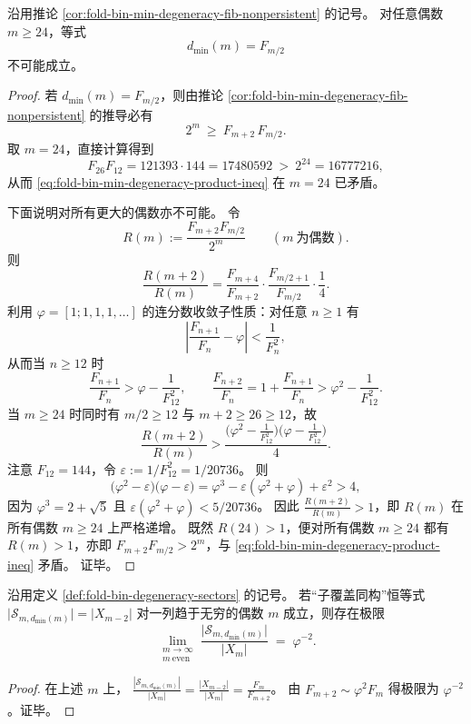 \begin{corollary}\label{cor:fold-bin-min-degeneracy-fib-explicit-cutoff}
沿用推论 \ref{cor:fold-bin-min-degeneracy-fib-nonpersistent} 的记号。
对任意偶数 \(m\ge 24\)，等式
\[
d_{\min}(m)=F_{m/2}
\]
不可能成立。
\end{corollary}
\begin{proof}
若 \(d_{\min}(m)=F_{m/2}\)，则由推论 \ref{cor:fold-bin-min-degeneracy-fib-nonpersistent} 的推导必有
\begin{equation}\label{eq:fold-bin-min-degeneracy-product-ineq}
2^m\ \ge\ F_{m+2}\,F_{m/2}.
\end{equation}
取 \(m=24\)，直接计算得到
\[
F_{26}F_{12}=121393\cdot 144=17480592\ >\ 2^{24}=16777216,
\]
从而 \eqref{eq:fold-bin-min-degeneracy-product-ineq} 在 \(m=24\) 已矛盾。
\par
下面说明对所有更大的偶数亦不可能。
令
\[
R(m):=\frac{F_{m+2}F_{m/2}}{2^m}\qquad(m\ \text{为偶数}).
\]
则
\[
\frac{R(m+2)}{R(m)}
=\frac{F_{m+4}}{F_{m+2}}\cdot \frac{F_{m/2+1}}{F_{m/2}}\cdot \frac{1}{4}.
\]
利用 \(\varphi=[1;1,1,1,\dots]\) 的连分数收敛子性质：对任意 \(n\ge 1\) 有
\[
\left|\frac{F_{n+1}}{F_n}-\varphi\right|<\frac{1}{F_n^2},
\]
从而当 \(n\ge 12\) 时
\[
\frac{F_{n+1}}{F_n}>\varphi-\frac{1}{F_{12}^2},
\qquad
\frac{F_{n+2}}{F_n}=1+\frac{F_{n+1}}{F_n}>\varphi^2-\frac{1}{F_{12}^2}.
\]
当 \(m\ge 24\) 时同时有 \(m/2\ge 12\) 与 \(m+2\ge 26\ge 12\)，故
\[
\frac{R(m+2)}{R(m)}
>\frac{\bigl(\varphi^2-\frac{1}{F_{12}^2}\bigr)\bigl(\varphi-\frac{1}{F_{12}^2}\bigr)}{4}.
\]
注意 \(F_{12}=144\)，令 \(\varepsilon:=1/F_{12}^2=1/20736\)。
则
\[
\bigl(\varphi^2-\varepsilon\bigr)\bigl(\varphi-\varepsilon\bigr)
=\varphi^3-\varepsilon(\varphi^2+\varphi)+\varepsilon^2
>4,
\]
因为 \(\varphi^3=2+\sqrt5\) 且 \(\varepsilon(\varphi^2+\varphi)<5/20736\)。
因此 \(\frac{R(m+2)}{R(m)}>1\)，即 \(R(m)\) 在所有偶数 \(m\ge 24\) 上严格递增。
既然 \(R(24)>1\)，便对所有偶数 \(m\ge 24\) 都有 \(R(m)>1\)，亦即 \(F_{m+2}F_{m/2}>2^m\)，与 \eqref{eq:fold-bin-min-degeneracy-product-ineq} 矛盾。
证毕。
\end{proof}

\begin{corollary}[子覆盖同构外推下的最小扇区密度极限]\label{cor:fold-bin-minsector-density-phi-minus2}
沿用定义 \ref{def:fold-bin-degeneracy-sectors} 的记号。
若“子覆盖同构”恒等式
\(
\bigl|\mathcal{S}_{m,d_{\min}(m)}\bigr|=|X_{m-2}|
\)
对一列趋于无穷的偶数 \(m\) 成立，则存在极限
\[
\lim_{\substack{m\to\infty\\ m\ \mathrm{even}}}
\frac{\bigl|\mathcal{S}_{m,d_{\min}(m)}\bigr|}{|X_m|}
\;=\;
\varphi^{-2}.
\]
\end{corollary}
\begin{proof}
在上述 \(m\) 上，
\(
\frac{|\mathcal{S}_{m,d_{\min}(m)}|}{|X_m|}=\frac{|X_{m-2}|}{|X_m|}=\frac{F_m}{F_{m+2}}
\)。
由 \(F_{m+2}\sim \varphi^2 F_m\) 得极限为 \(\varphi^{-2}\)。证毕。
\end{proof}

